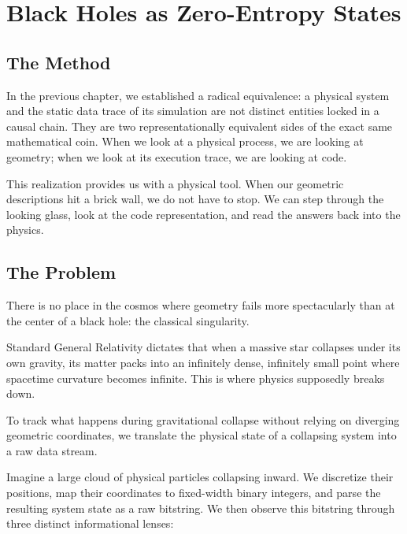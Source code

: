 \chapter{Black Holes as Zero-Entropy States}

\section{The Method}

In the previous chapter, we established a radical equivalence:
a physical system and the static data trace of its simulation are not distinct entities locked in a causal chain.
They are two representationally equivalent sides of the exact same mathematical coin.
When we look at a physical process, we are looking at geometry; when we look at its execution trace, we are looking at code. 

This realization provides us with a physical tool.
When our geometric descriptions hit a brick wall, we do not have to stop.
We can step through the looking glass, look at the code representation,
and read the answers back into the physics.


\section{The Problem}

There is no place in the cosmos where geometry fails more spectacularly
than at the center of a black hole: the classical singularity. 

Standard General Relativity dictates that when a massive star collapses under its own gravity,
its matter packs into an infinitely dense, infinitely small point where spacetime curvature becomes infinite.
This is where physics supposedly breaks down. 

To track what happens during gravitational collapse without relying on diverging geometric coordinates,
we translate the physical state of a collapsing system into a raw data stream. 

Imagine a large cloud of physical particles collapsing inward.
We discretize their positions, map their coordinates to fixed-width binary integers,
and parse the resulting system state as a raw bitstring.
We then observe this bitstring through three distinct informational lenses:

